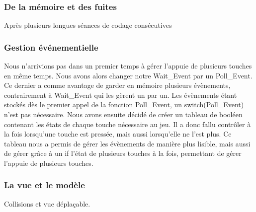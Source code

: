 	\subsubsection{De la mémoire et des fuites}

Après plusieurs longues séances de codage consécutives

	\subsubsection{Gestion événementielle}
	
	Nous n'arrivions pas dans un premier temps à gérer l'appuie de plusieurs touches en même temps. Nous avons alors changer notre Wait\_Event par un Poll\_Event. Ce dernier a comme avantage de garder en mémoire plusieurs évènements, contrairement à Wait\_Event qui les gèrent un par un. Les évènements étant stockés dès le premier appel de la fonction Poll\_Event, un switch(Poll\_Event) n'est pas nécessaire. Nous avons ensuite décidé de créer un tableau de booléen contenant les états de chaque touche nécessaire au jeu. Il a donc fallu contrôler à la fois lorsqu'une touche est pressée, mais aussi lorsqu'elle ne l'est plus. Ce tableau nous a permis de gérer les évènements de manière plus lisible, mais aussi de gérer grâce à un if l'état de plusieurs touches à la fois, permettant de gérer l'appuie de plusieurs touches. 

	\subsubsection{La vue et le modèle}
Collisions et vue déplaçable.
